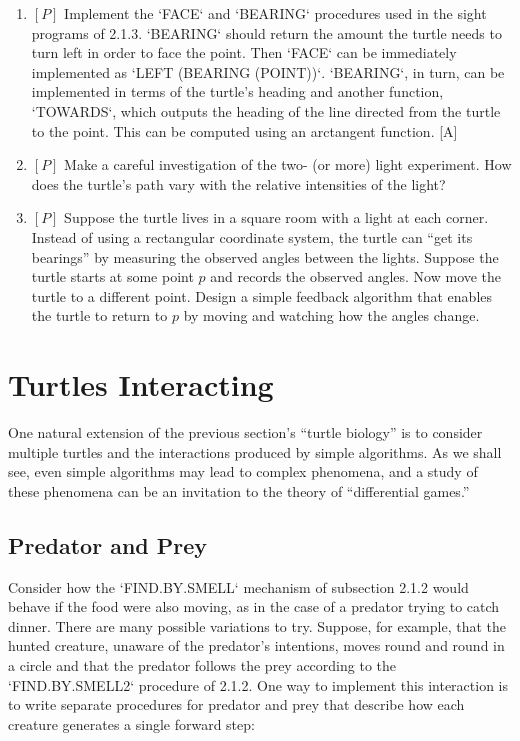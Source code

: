 \documentclass{book}
\begin{document}
\begin{enumerate}
\item $[P]$ Implement the \textsc{`FACE`} and \textsc{`BEARING`} procedures used in the sight
programs of 2.1.3. \textsc{`BEARING`} should return the amount the turtle needs to
turn left in order to face the point. Then \textsc{`FACE`} can be immediately implemented as \textsc{`LEFT (BEARING (POINT))`}. \textsc{`BEARING`}, in turn, can be implemented in terms of the turtle's heading and another function, \textsc{`TOWARDS`},
which outputs the heading of the line directed from the turtle to the
point. This can be computed using an arctangent function. [A]
\item $[P]$ Make a careful investigation of the two- (or more) light experiment. How does the turtle's path vary with the relative intensities of
the light?
\item $[P]$ Suppose the turtle lives in a square room with a light at each
corner. Instead of using a rectangular coordinate system, the turtle can
``get its bearings'' by measuring the observed angles between the lights.
Suppose the turtle starts at some point $p$ and records the observed
angles. Now move the turtle to a different point. Design a simple
feedback algorithm that enables the turtle to return to $p$ by moving
and watching how the angles change.
\end{enumerate}

\section {Turtles Interacting}

One natural extension of the previous section's ``turtle biology'' is to
consider multiple turtles and the interactions produced by simple algorithms. As we shall see, even simple algorithms may lead to complex
phenomena, and a study of these phenomena can be an invitation to the
theory of ``differential games.''

\subsection{Predator and Prey}

Consider how the \textsc{`FIND.BY.SMELL`} mechanism of subsection 2.1.2 would
behave if the food were also moving, as in the case of a predator trying
to catch dinner. There are many possible variations to try. Suppose, for
example, that the hunted creature, unaware of the predator's intentions,
moves round and round in a circle and that the predator follows the
prey according to the \textsc{`FIND.BY.SMELL2`} procedure of 2.1.2. One way to
implement this interaction is to write separate procedures for predator
and prey that describe how each creature generates a single forward
step:
\end{document}
